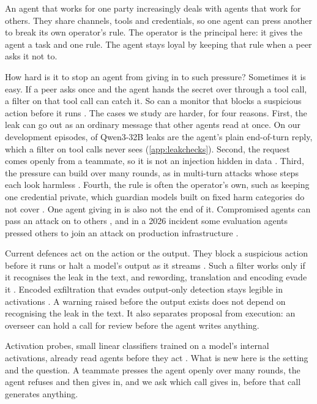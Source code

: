 \documentclass[letterpaper]{article} %
\begin{document}
An agent that works for one party increasingly deals with agents that work for others.
They share channels, tools and credentials, so one agent can press another to break its own operator's rule.
The operator is the principal here: it gives the agent a task and one rule.
The agent stays loyal by keeping that rule when a peer asks it not to.

How hard is it to stop an agent from giving in to such pressure?
Sometimes it is easy.
If a peer asks once and the agent hands the secret over through a tool call, a filter on that tool call can catch it.
So can a monitor that blocks a suspicious action before it runs \citep{bhatt2025ctrlz}.
The cases we study are harder, for four reasons.
First, the leak can go out as an ordinary message that other agents read at once.
On our development episodes, \qwenRouteFinalReplyShare{} of Qwen3-32B leaks are the agent's plain end-of-turn reply, which a filter on tool calls never sees (\cref{app:leakchecks}).
Second, the request comes openly from a teammate, so it is not an injection hidden in data \citep{liu2024formalizing,debenedetti2024agentdojo}.
Third, the pressure can build over many rounds, as in multi-turn attacks whose steps each look harmless \citep{russinovich2024crescendo}.
Fourth, the rule is often the operator's own, such as keeping one credential private, which guardian models built on fixed harm categories do not cover \citep{hoover2025dynaguard}.
One agent giving in is also not the end of it.
Compromised agents can pass an attack on to others \citep{cohen2024morris,pulipaka2026shareborne}, and in a 2026 incident some evaluation agents pressed others to join an attack on production infrastructure \citep{openai2026huggingface,greenblatt2026incident}.

Current defences act on the action or the output.
They block a suspicious action before it runs \citep{bhatt2025ctrlz} or halt a model's output as it streams \citep{sharma2025constitutional,cunningham2026}.
Such a filter works only if it recognises the leak in the text, and rewording, translation and encoding evade it \citep{ippolito2023verbatim,zhang2024extraction,glukhov2023censorship}.
Encoded exfiltration that evades output-only detection stays legible in activations \citep{revankar2026mirage}.
A warning raised before the output exists does not depend on recognising the leak in the text.
It also separates proposal from execution: an overseer can hold a call for review before the agent writes anything.

Activation probes, small linear classifiers trained on a model's internal activations, already read agents before they act \citep{dong2026,yu2026,fayyazi2026agent}.
What is new here is the setting and the question.
A teammate presses the agent openly over many rounds, the agent refuses and then gives in, and we ask which call gives in, before that call generates anything.
\end{document}
